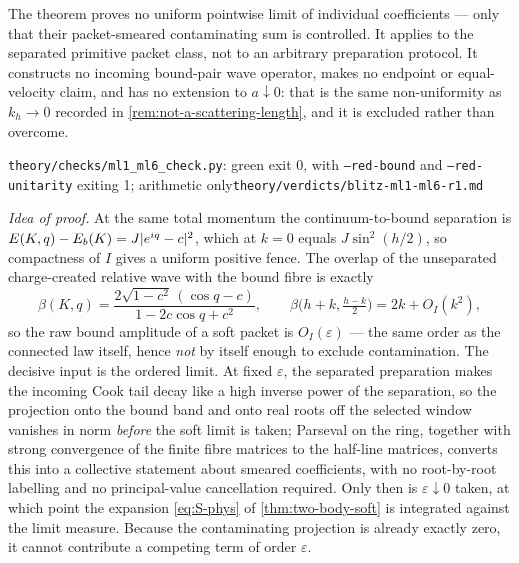 \begin{scope}
The theorem proves no uniform pointwise limit of individual coefficients ---
only that their packet-smeared contaminating sum is controlled. It applies to
the separated primitive packet class, not to an arbitrary preparation
protocol. It constructs no incoming bound-pair wave operator, makes no
endpoint or equal-velocity claim, and has no extension to $a\downarrow0$: that
is the same non-uniformity as $k_h\to0$ recorded in
\cref{rem:not-a-scattering-length}, and it is excluded rather than overcome.
\end{scope}
%
{\texttt{theory/checks/ml1\_ml6\_check.py}: green exit 0, with
\texttt{--red-bound} and \texttt{--red-unitarity} exiting 1; arithmetic
only}{\texttt{theory/verdicts/blitz-ml1-ml6-r1.md}}

\emph{Idea of proof.} At the same total momentum the continuum-to-bound
separation is $E(K,q)-E_b(K)=J\lvert e^{iq}-c\rvert^2$, which at $k=0$ equals
$J\sin^2(h/2)$, so compactness of $I$ gives a uniform positive fence. The
overlap of the unseparated charge-created relative wave with the bound fibre
is exactly
\begin{equation}
  \beta(K,q)=\frac{2\sqrt{1-c^2}\,(\cos q-c)}{1-2c\cos q+c^2},
  \qquad
  \beta\bigl(h+k,\tfrac{h-k}{2}\bigr)=2k+O_I(k^2),
\end{equation}
so the raw bound amplitude of a soft packet is $O_I(\varepsilon)$ --- the same
order as the connected law itself, hence \emph{not} by itself enough to
exclude contamination. The decisive input is the ordered limit. At fixed
$\varepsilon$, the separated preparation makes the incoming Cook tail decay
like a high inverse power of the separation, so the projection onto the bound
band and onto real roots off the selected window vanishes in norm
\emph{before} the soft limit is taken; Parseval on the ring, together with
strong convergence of the finite fibre matrices to the half-line matrices,
converts this into a collective statement about smeared coefficients, with no
root-by-root labelling and no principal-value cancellation required. Only then
is $\varepsilon\downarrow0$ taken, at which point the expansion
\cref{eq:S-phys} of \cref{thm:two-body-soft} is integrated against the limit
measure. Because the contaminating projection is already exactly zero, it
cannot contribute a competing term of order $\varepsilon$.

